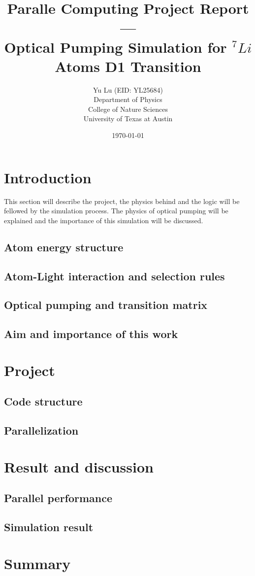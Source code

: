 \documentclass[a4paper, 10pt]{article}
\title{Paralle Computing Project Report --- \\ Optical Pumping Simulation for  $^{7}Li$ Atoms D1 Transition}
\author{
  Yu Lu (EID: YL25684) \\
  Department of Physics \\
  College of Nature Sciences \\
  University of Texas at Austin}
\date{\today}
\begin{document}
\titlepage
\maketitle
\tableofcontents
\newpage
\section{Introduction}
This section will describe the project, the physics behind and the logic will be fellowed by the simulation process. The physics of optical pumping will be explained and the importance of this simulation will be discussed.

\subsection{Atom energy structure}
\subsection{Atom-Light interaction and selection rules}
\subsection{Optical pumping and transition matrix}
\subsection{Aim and importance of this work}

\section{Project}

\subsection{Code structure}

\subsection{Parallelization}

\section{Result and discussion}

\subsection{Parallel performance}

\subsection{Simulation result}

\section{Summary}



  
\end{document}
